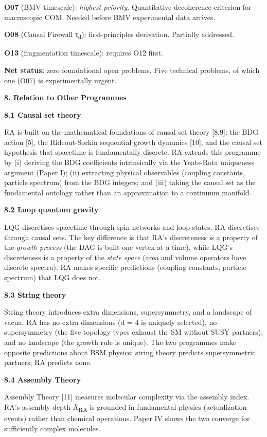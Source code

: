 \documentclass[12pt,a4paper]{article}
\begin{document}
\textbf{O07} (BMV timescale): \emph{highest priority}. Quantitative
decoherence criterion for macroscopic COM. Needed before BMV
experimental data arrives.

\textbf{O08} (Causal Firewall τ\textsubscript{d}): first-principles
derivation. Partially addressed.

\textbf{O13} (fragmentation timescale): requires O12 first.

\textbf{Net status:} zero foundational open problems. Five technical
problems, of which one (O07) is experimentally urgent.

\textbf{8. Relation to Other Programmes}

\textbf{8.1 Causal set theory}

RA is built on the mathematical foundations of causal set theory
{[}8,9{]}: the BDG action {[}5{]}, the Rideout-Sorkin sequential growth
dynamics {[}10{]}, and the causal set hypothesis that spacetime is
fundamentally discrete. RA extends this programme by (i) deriving the
BDG coefficients intrinsically via the Yeats-Rota uniqueness argument
(Paper I); (ii) extracting physical observables (coupling constants,
particle spectrum) from the BDG integers; and (iii) taking the causal
set as the fundamental ontology rather than an approximation to a
continuum manifold.

\textbf{8.2 Loop quantum gravity}

LQG discretises spacetime through spin networks and loop states. RA
discretises through causal sets. The key difference is that RA's
discreteness is a property of the \emph{growth process} (the DAG is
built one vertex at a time), while LQG's discreteness is a property of
the \emph{state space} (area and volume operators have discrete
spectra). RA makes specific predictions (coupling constants, particle
spectrum) that LQG does not.

\textbf{8.3 String theory}

String theory introduces extra dimensions, supersymmetry, and a
landscape of vacua. RA has no extra dimensions (d = 4 is uniquely
selected), no supersymmetry (the five topology types exhaust the SM
without SUSY partners), and no landscape (the growth rule is unique).
The two programmes make opposite predictions about BSM physics: string
theory predicts supersymmetric partners; RA predicts none.

\textbf{8.4 Assembly Theory}

Assembly Theory {[}11{]} measures molecular complexity via the assembly
index. RA's assembly depth Ã\textsubscript{RA} is grounded in
fundamental physics (actualization events) rather than chemical
operations. Paper IV shows the two converge for sufficiently complex
molecules.
\end{document}
